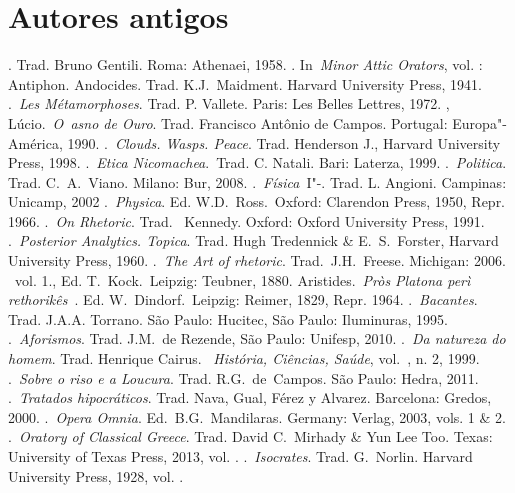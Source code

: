  

\section{Autores antigos}

 

\begin{bibliohedra}
. Trad. Bruno Gentili. Roma: Athenaei, 1958.
. In~\emph{Minor Attic Orators}, vol. : Antiphon.
  Andocides. Trad. K.J.~Maidment. Harvard University Press, 1941.
.~\emph{Les Métamorphoses}. Trad. P. Vallete. Paris: Les Belles
  Lettres, 1972.
, Lúcio.~\emph{O~asno de Ouro}. Trad. Francisco Antônio de
  Campos. Portugal: Europa"-América, 1990.
.~\emph{Clouds. Wasps. Peace}. Trad. Henderson J., Harvard
  University Press, 1998.
.~\emph{Etica Nicomachea}.~Trad. C. Natali. Bari: Laterza,
  1999.
.~\emph{Politica}. Trad. C.~A.~Viano. Milano: Bur, 2008.
.~\emph{Física}~I"-. Trad. L. Angioni. Campinas: Unicamp,
  2002
.~\emph{Physica}. Ed. W.D.~Ross.~Oxford: Clarendon Press,
  1950, Repr. 1966.
.~\emph{On Rhetoric}. Trad. ~Kennedy. Oxford: Oxford
  University Press, 1991.
.~\emph{Posterior Analytics. Topica}. Trad. Hugh Tredennick
  \& E.~S.~Forster, Harvard University Press, 1960.
.~\emph{The Art of rhetoric}. Trad.~J.H.~Freese. Michigan:
  2006.
~vol. 1., Ed. T.~Kock.~Leipzig: Teubner, 1880.
 Aristides.~\emph{Pròs Platona perì rethorikês~}. Ed. W.~Dindorf.~Leipzig: Reimer, 1829, Repr. 1964.
.~\emph{Bacantes}. Trad. J.A.A. Torrano. São Paulo: Hucitec,
  São Paulo: Iluminuras, 1995.
.~\emph{Aforismos}. Trad. J.M.~de Rezende, São Paulo:
  Unifesp, 2010.
.~\emph{Da natureza do homem}. Trad. Henrique Cairus.
  ~\emph{História, Ciências, Saúde}, vol.~, n. 2, 1999.
.~\emph{Sobre o riso e a Loucura}. Trad. R.G.~de~Campos.
  São Paulo: Hedra, 2011.
.~\emph{Tratados hipocráticos}. Trad. Nava, Gual, Férez y
  Alvarez. Barcelona: Gredos, 2000.
.~\emph{Opera Omnia}. Ed.~B.G.~Mandilaras. Germany:
  Verlag, 2003, vols. 1 \& 2.
.~\emph{Oratory of Classical Greece}. Trad. David C.~Mirhady \&
  Yun Lee Too. Texas: University of Texas Press, 2013, vol. .
.~\emph{Isocrates}. Trad. G.~Norlin. Harvard University Press, 1928, vol. .

\end{bibliohedra}
